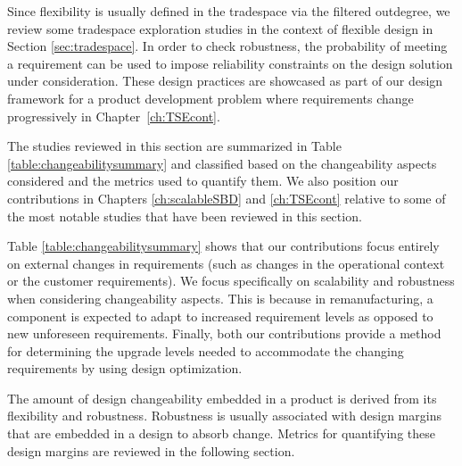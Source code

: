 


Since flexibility is usually defined in the tradespace via the filtered outdegree, we review some tradespace exploration studies in the context of flexible design in Section \ref{sec:tradespace}. In order to check robustness, the probability of meeting a requirement can be used to impose reliability constraints on the design solution under consideration. These design practices are showcased as part of our design framework for a product development problem where requirements change progressively in Chapter~\ref{ch:TSEcont}.

The studies reviewed in this section are summarized in Table \ref{table:changeabilitysummary} and classified based on the changeability aspects considered and the metrics used to quantify them. We also position our contributions in Chapters \ref{ch:scalableSBD} and \ref{ch:TSEcont} relative to some of the most notable studies that have been reviewed in this section.

Table \ref{table:changeabilitysummary} shows that our contributions focus entirely on external changes in requirements (such as changes in the operational context or the customer requirements). We focus specifically on scalability and robustness when considering changeability aspects. This is because in remanufacturing, a component is expected to adapt to increased requirement levels as opposed to new unforeseen requirements. Finally, both our contributions provide a method for determining the upgrade levels needed to accommodate the changing requirements by using design optimization.

The amount of design changeability embedded in a product is derived from its flexibility and robustness. Robustness is usually associated with design margins that are embedded in a design to absorb change. Metrics for quantifying these design margins are reviewed in the following section.

